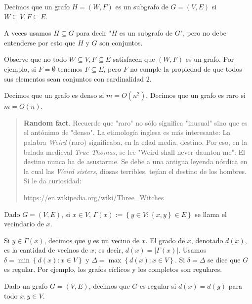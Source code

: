 \documentclass[a4paper]{article}
\begin{document}
\begin{definition}
    Decimos que un grafo $H = (W, F)$ es un subgrafo de $G =(V, E)$ si
    $W \subseteq V, F \subseteq E$.
\end{definition}

A veces usamos $H \subseteq G$ para decir "$H$ es un subgrafo de $G$", pero no
debe entenderse por esto que $H$ y $G$ son conjuntos.

Observe que no todo $W \subseteq V, F \subseteq E$ satisfacen que $(W, F)$ es un
grafo. Por ejemplo, si $F = \emptyset$ tenemos $F \subseteq E$, pero $F$
no cumple la propiedad de que todos sus elementos sean conjuntos con cardinalidad $2$.

\begin{definition}[Densidad]
    Decimos que un grafo es denso si $m = O(n^2)$. Decimos que un grafo es raro
    si $m = O(n)$.
\end{definition}


\small
\begin{quote}

\textbf{Random fact}. Recuerde que "raro" no sólo significa "inusual" sino que es el
antónimo de "denso". La etimología inglesa es más interesante:
La palabra \textit{Weird} (raro) significaba, en la edad media, destino. Por
eso, en la balada medieval \textit{True Thomas}, se lee "Weird shall never
daunton me": El destino nunca ha de asustarme. Se debe a una antigua leyenda
nórdica en la cual las \textit{Weird sisters}, diosas terribles, tejían el
destino de los hombres. Si le da curiosidad:

https://en.wikipedia.org/wiki/Three_Witches

\end{quote}
\normalsize

\begin{definition}
    Dado $G = (V, E) $, si $x \in V$, $\Gamma(x) := \left\{ y \in V : \left\{ x,
        y\right\}  \in E
\right\} $ se llama el vecindario de $x$. 
\end{definition}

Si $y \in \Gamma(x)$, decimos que $y$
es un vecino de $x$.  El grado de $x$, denotado $d(x)$, es la cantidad de
vecinos de $x$; es decir, $d(x) = |\Gamma(x)|$.
Usamos $\delta = \min \left\{ d(x) : x \in V \right\} $ y $\Delta = \max \left\{
d(x) : x \in V\right\} $. Si $\delta = \Delta$ se dice que $G$ es regular. Por
ejemplo, los
grafos cíclicos y los completos son regulares.

\begin{definition}
    Dado un grafo $G = (V, E) $, decimos que $G$ es regular si $d(x) = d(y)$
    para todo $x, y \in V$.
\end{definition}
\end{document}
